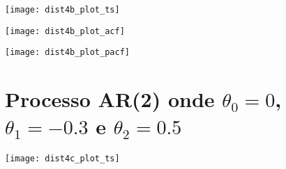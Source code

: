 \begin{center}
\begin{centering}
\texttt{[image: dist4b\_plot\_ts]}
\par\end{centering}
\par\end{center}


\begin{center}
\begin{centering}
\texttt{[image: dist4b\_plot\_acf]}
\par\end{centering}
\par\end{center}

\begin{center}
\begin{centering}
\texttt{[image: dist4b\_plot\_pacf]}
\par\end{centering}
\par\end{center}



\section{Processo AR(2) onde $\theta_{0}=0$, $\theta_{1}=-0.3$ e $\theta_{2}=0.5$}

\begin{center}
\begin{centering}
\texttt{[image: dist4c\_plot\_ts]}
\par\end{centering}
\par\end{center}


